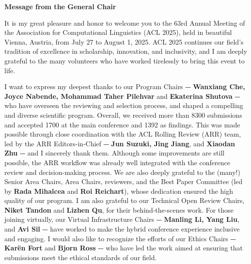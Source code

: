 \textbf{Message from the General Chair}

It is my great pleasure and honor to welcome you to the 63rd Annual Meeting of the Association for Computational Linguistics (ACL 2025), held in beautiful Vienna, Austria, from July 27 to August 1, 2025. ACL 2025 continues our field’s tradition of excellence in scholarship, innovation, and inclusivity, and I am deeply grateful to the many volunteers who have worked tirelessly to bring this event to life.

I want to express my deepest thanks to our Program Chairs ⏤ \textbf{Wanxiang Che, Joyce Nabende, Mohammad Taher Pilehvar} and \textbf{Ekaterina Shutova} ⏤ who have overseen the reviewing and selection process, and shaped a compelling and diverse scientific program. Overall, we received more than 8300 submissions and accepted 1700 at the main conference and 1392 as findings. This was made possible through close coordination with the ACL Rolling Review (ARR) team, led by the ARR Editors-in-Chief ⏤ \textbf{Jun Suzuki, Jing Jiang}, and \textbf{Xiaodan Zhu} ⏤ and I sincerely thank them. Although some improvements are still possible, the ARR workflow was already well integrated with the conference review and decision-making process. We are also deeply grateful to the (many!) Senior Area Chairs, Area Chairs, reviewers, and the Best Paper Committee (led by \textbf{Rada Mihalcea} and \textbf{Roi Reichart}), whose dedication ensured the high quality of our program. I am also grateful to our Technical Open Review Chairs, \textbf{Niket Tandon} and \textbf{Lizhen Qu}, for their behind-the-scenes work. For those joining virtually, our Virtual Infrastructure Chairs ⏤ \textbf{Manling Li, Yang Liu}, and \textbf{Avi Sil} ⏤ have worked to make the hybrid conference experience inclusive and engaging. I would also like to recognize the efforts of our Ethics Chairs ⏤ \textbf{Karën Fort} and \textbf{Bjorn Ross} ⏤ who have led the work aimed at ensuring that submissions meet the ethical standards of our field. 


